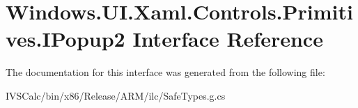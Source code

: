 \hypertarget{interface_windows_1_1_u_i_1_1_xaml_1_1_controls_1_1_primitives_1_1_i_popup2}{}\section{Windows.\+U\+I.\+Xaml.\+Controls.\+Primitives.\+I\+Popup2 Interface Reference}
\label{interface_windows_1_1_u_i_1_1_xaml_1_1_controls_1_1_primitives_1_1_i_popup2}


The documentation for this interface was generated from the following file\+:\begin{DoxyCompactItemize}
\item 
I\+V\+S\+Calc/bin/x86/\+Release/\+A\+R\+M/ilc/Safe\+Types.\+g.\+cs\end{DoxyCompactItemize}
